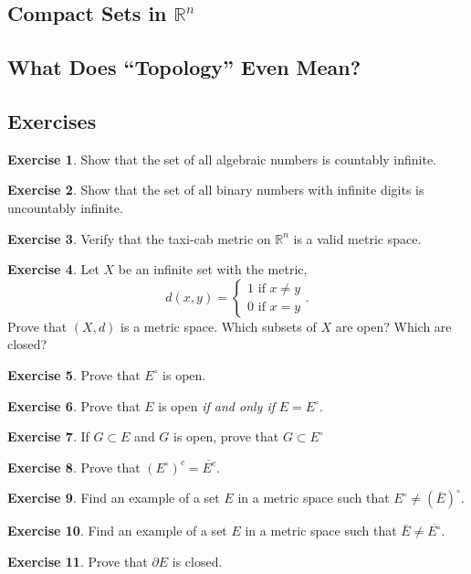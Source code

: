 \documentclass{article}
\newcommand{\R}{\mathbb{R}}
\theoremstyle{definition}
\newtheorem{ex}{Exercise}[section]
\begin{document}
\subsection{Compact Sets in $ \R^n $}
\subsection{What Does ``Topology'' Even Mean?}
\subsection{Exercises}
\begin{ex}
	Show that the set of all algebraic numbers is countably infinite.
\end{ex}
\begin{ex}
	Show that the set of all binary numbers with infinite digits is uncountably infinite.
\end{ex}
\begin{ex}
	Verify that the taxi-cab metric on $ \R^n $ is a valid metric space.
\end{ex}
\begin{ex}
	Let $ X $ be an infinite set with the metric, $$d(x,y)=\begin{cases}
		1\text{ if }x\neq y\\
	0\text{ if }x=y
	\end{cases} .$$ Prove that $ (X,d) $ is a metric space. Which subsets of $ X $ are open? Which are closed? 
\end{ex}
\begin{ex}
	Prove that $ E^\circ $ is open.
\end{ex}
\begin{ex}
	Prove that $ E $ is open \textit{if and only if} $ E=E^\circ $.
\end{ex}
\begin{ex}
	If $ G\subset E $ and $ G $ is open, prove that $ G\subset E^\circ $
\end{ex}
\begin{ex}
	Prove that $ (E^\circ)^c=\overline{E^c} $.
\end{ex}
\begin{ex}
	Find an example of a set $ E  $ in a metric space such that $ E^\circ\neq(\bar{E} )^\circ$.
\end{ex}
\begin{ex}
	Find an example of a set $ E  $ in a metric space such that $ \bar{E}\neq\overline{E^\circ}$.
\end{ex}
\begin{ex}
	Prove that $ \partial E $ is closed.
\end{ex}
\end{document}
